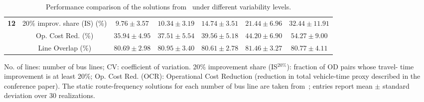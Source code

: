 \documentclass[a4paper,fleqn]{cas-sc}
\begin{document}
\begin{table}[pos=H]
\begin{threeparttable}
\begin{tabular*}{\textwidth}{@{\extracolsep{\fill}}ccccccc@{}}
\multirow{3}{*}{\textbf{12}}
& 20\% improv. share (IS) (\%)
& $9.76\pm3.57$ & $10.34\pm3.19$ & $14.74\pm3.51$
& $21.44\pm6.96$ & $32.44\pm11.91$ \\
& Op. Cost Red. (\%)
& $35.94\pm4.95$ & $37.51\pm5.54$ & $39.56\pm5.18$
& $44.20\pm6.90$ & $54.27\pm9.00$ \\
& Line Overlap (\%)
& $80.69\pm2.98$ & $80.95\pm3.40$ & $80.61\pm2.78$
& $81.46\pm3.27$ & $80.77\pm4.11$ \\

\bottomrule
\end{tabular*}

\begin{tablenotes}
\scriptsize
\item No. of lines: number of bus lines; CV: coefficient of variation.
20\% improvement share (IS$^{20\%}$): fraction of OD pairs whose travel-
time improvement is at least 20\%;
Op. Cost Red. (OCR): Operational Cost Reduction (reduction in total
vehicle-time proxy described in the conference paper).
The static route-frequency solutions for each number of bus line are taken from~\citet{ahern2022approximate}; entries report mean $\pm$ standard deviation over 30 realizations.
\end{tablenotes}

\end{threeparttable}
\caption{Performance comparison of the solutions from~\citet{ahern2022approximate} under different variability levels.}
\label{tab:routeNumberCV}
\end{table}
\end{document}
